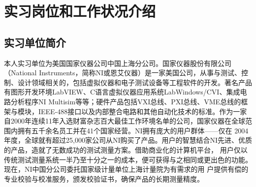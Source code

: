 \documentclass[UTF8]{ctexart}
\begin{document}
\section{实习岗位和工作状况介绍}
\subsection{实习单位简介}
本人实习单位为美国国家仪器公司中国上海分公司。国家仪器股份有限公司（National Instruments，简称NI或恩艾仪器）是一家美国公司，从事与测试、控
制、设计领域相关的，包括虚拟仪器和电子测试设备等工程软件的开发。著名产品有图形开发环境LabVIEW、C语言虚拟仪器应用系统LabWindows/CVI、集成电
路分析程序NI Multisim等等；硬件产品包括VXI总线、PXI总线、VME总线的框架与模块，IEEE-488接口以及内部整合电路和其他自动化技术的标准。作为一家
自2000年连续11年入选财富杂志百大最佳工作环境名单的公司，国家仪器在全球范围内拥有五千余名员工并在41个国家经营。NI拥有庞大的用户群体——仅在
2004年度，全球就有超过25,000家公司从NI购买了产品。用户的智慧结合NI先进、优质的产品，造就了无数成功的测试测量方案。借助商业化的计算机平台，
用户仅以传统测试测量系统一半乃至十分之一的成本，便可获得与之相同或更出色的功能。现在，NI中国分公司委托国家级计量单位上海计量院为有需求的用
户提供有偿的专业校验与校准服务，颁发校验证书，确保产品的长期测量精度。

%
\end{document}
